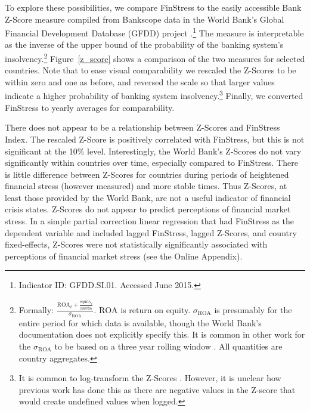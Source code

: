 \documentclass[]{article}
\begin{document}
To explore these possibilities, we compare FinStress to the easily accessible Bank Z-Score measure compiled from Bankscope data in the World Bank's Global Financial Development Database (GFDD) project \citep{worldbank2013}.\footnote{Indicator ID: GFDD.SI.01. Accessed June 2015.} The measure is interpretable as the inverse of the upper bound of the probability of the banking system's insolvency.\footnote{Formally: $\frac{\mathrm{ROA}_{t} + \frac{\mathrm{equity}_{t}}{\mathrm{assets}_{t}}}{\sigma_{\mathrm{ROA}}}$. $\mathrm{ROA}$ is return on equity. $\sigma_{\mathrm{ROA}}$ is presumably for the entire period for which data is available, though the World Bank's documentation does not explicitly specify this. It is common in other work for the $\sigma_{\mathrm{ROA}}$ to be based on a three year rolling window \cite[225]{beck2013bank}. All quantities are country aggregates.} Figure~\ref{z_score} shows a comparison of the two measures for selected countries. Note that to ease visual comparability we rescaled the Z-Scores to be within zero and one as before, and reversed the scale so that larger values indicate a higher probability of banking system insolvency.\footnote{It is common to log-transform the Z-Scores \cite[225]{beck2013bank}. However, it is unclear how previous work has done this as there are negative values in the Z-score that would create undefined values when logged.} Finally, we converted FinStress to yearly averages for comparability.

There does not appear to be a relationship between Z-Scores and FinStress Index. The rescaled Z-Score is positively correlated with FinStress, but this is not significant at the 10\% level. Interestingly, the World Bank's Z-Scores do not vary significantly within countries over time, especially compared to  FinStress. There is little difference between Z-Scores for countries during periods of heightened financial stress (however measured) and more stable times. Thus Z-Scores, at least those provided by the World Bank, are not a useful indicator of financial crisis states. Z-Scores do not appear to predict perceptions of financial market stress. In a simple partial correction linear regression that had FinStress as the dependent variable and included lagged FinStress, lagged Z-Scores, and country fixed-effects, Z-Scores were not statistically significantly associated with perceptions of financial market stress (see the Online Appendix).
\end{document}
